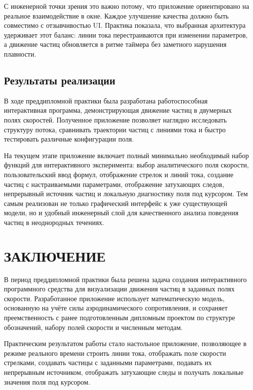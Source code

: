 \documentclass[14pt,a4paper]{extarticle}
\numberwithin{figure}{section}
\numberwithin{table}{section}
\begin{document}
С инженерной точки зрения это важно потому, что приложение ориентировано на
реальное взаимодействие в окне. Каждое улучшение качества должно быть совместимо
с отзывчивостью UI. Практика показала, что выбранная архитектура удерживает этот
баланс: линии тока перестраиваются при изменении параметров, а движение частиц
обновляется в ритме таймера без заметного нарушения плавности.

\subsection{Результаты реализации}

В ходе преддипломной практики была разработана работоспособная интерактивная
программа, демонстрирующая движение частиц в двумерных полях скоростей. Полученное
приложение позволяет наглядно исследовать структуру потока, сравнивать траектории
частиц с линиями тока и быстро тестировать различные конфигурации поля.

На текущем этапе приложение включает полный минимально необходимый набор
функций для интерактивного эксперимента: выбор аналитического поля скорости,
пользовательский ввод формул, отображение стрелок и линий тока, создание частиц
с настраиваемыми параметрами, отображение затухающих следов, непрерывный источник
частиц и локальную диагностику поля под курсором. Тем самым реализован не только
графический интерфейс к уже существующей модели, но и удобный инженерный слой для
качественного анализа поведения частиц в неоднородных течениях.

\newpage
\section*{ЗАКЛЮЧЕНИЕ}

В период преддипломной практики была решена задача создания интерактивного
программного средства для визуализации движения частиц в заданных полях скорости.
Разработанное приложение использует математическую модель, основанную на учёте
силы аэродинамического сопротивления, и сохраняет преемственность с ранее
подготовленным дипломным проектом по структуре обозначений, набору полей скорости
и численным методам.

Практическим результатом работы стало настольное приложение, позволяющее в режиме
реального времени строить линии тока, отображать поле скорости стрелками,
создавать частицы с заданными параметрами, подавать их непрерывным источником,
отображать затухающие следы и получать локальные значения поля под курсором.
\end{document}

